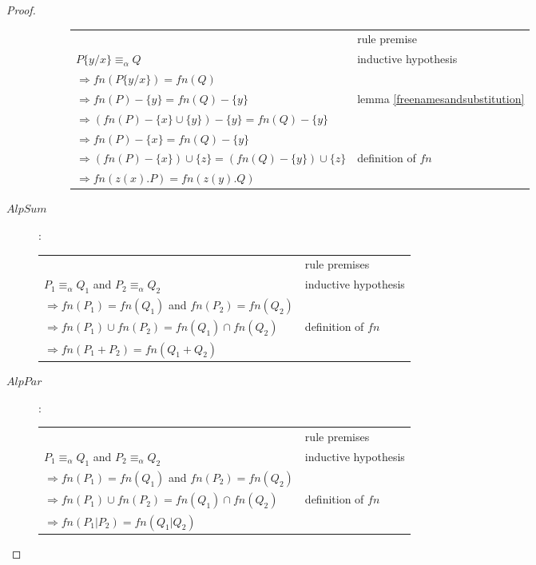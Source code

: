 \begin{lemma}
\begin{proof}
\begin{description}
\begin{description}
\begin{center}
	      \begin{tabular}{ll}
		&rule premise\\
		$P\{y/x\}\equiv_{\alpha}Q$&inductive hypothesis\\
		$\Rightarrow fn(P\{y/x\})=fn(Q)$&\\
		$\Rightarrow fn(P)-\{y\}=fn(Q)-\{y\}$&lemma \ref{freenamesandsubstitution}\\
		$\Rightarrow (fn(P)-\{x\}\cup \{y\})-\{y\}=fn(Q)-\{y\}$&\\
		$\Rightarrow fn(P)-\{x\}=fn(Q)-\{y\}$&\\
		$\Rightarrow (fn(P)-\{x\})\cup \{z\}=(fn(Q)-\{y\})\cup \{z\}$&definition of $fn$\\
		$\Rightarrow fn(z(x).P)=fn(z(y).Q)$&\\
	      \end{tabular}
	    \end{center}
	\end{description}
      \item[$AlpSum$]:
	\begin{center}
	  \begin{tabular}{ll}
	    &rule premises\\
	    $P_{1}\equiv_{\alpha}Q_{1}$ and $P_{2}\equiv_{\alpha}Q_{2}$&inductive hypothesis\\
	    $\Rightarrow fn(P_{1})=fn(Q_{1})$ and $fn(P_{2})=fn(Q_{2})$&\\
	    $\Rightarrow fn(P_{1})\cup fn(P_{2})=fn(Q_{1})\cap fn(Q_{2})$&definition of $fn$\\
	    $\Rightarrow fn(P_{1}+P_{2})=fn(Q_{1}+Q_{2})$&\\
	  \end{tabular}
	\end{center}
      \item[$AlpPar$]:
	\begin{center}
	  \begin{tabular}{ll}
	    &rule premises\\
	    $P_{1}\equiv_{\alpha}Q_{1}$ and $P_{2}\equiv_{\alpha}Q_{2}$&inductive hypothesis\\
	    $\Rightarrow fn(P_{1})=fn(Q_{1})$ and $fn(P_{2})=fn(Q_{2})$&\\
	    $\Rightarrow fn(P_{1})\cup fn(P_{2})=fn(Q_{1})\cap fn(Q_{2})$&definition of $fn$\\
	    $\Rightarrow fn(P_{1}|P_{2})=fn(Q_{1}|Q_{2})$&\\
	  \end{tabular}
	\end{center}

\end{description}
\end{proof}
\end{lemma}
